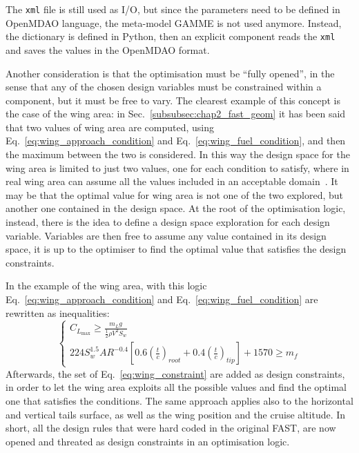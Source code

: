 The \texttt{xml} file is still used as I/O, but since the parameters need to be defined in OpenMDAO language, the meta-model GAMME is not used anymore. 
Instead, the dictionary is defined in Python, then an explicit component reads the \texttt{xml} and saves the values in the OpenMDAO format. 

Another consideration is that the optimisation must be ``fully opened'', in the sense that any of the chosen design variables must be constrained within a component, but it must be free to vary. 
The clearest example of this concept is the case of the wing area: in Sec.~\ref{subsubsec:chap2_fast_geom} it has been said that two values of wing area are computed, using Eq.~\eqref{eq:wing_approach_condition} and Eq.~\eqref{eq:wing_fuel_condition}, and then the maximum between the two is considered. 
In this way the design space for the wing area is limited to just two values, one for each condition to satisfy, where in real wing area can assume all the values included in an acceptable domain~\cite{bib:roskam_partI}. 
It may be that the optimal value for wing area is not one of the two explored, but another one contained in the design space.  
At the root of the optimisation logic, instead, there is the idea to define a design space exploration for each design variable.
Variables are then free to assume any value contained in its design space, it is up to the optimiser to find the optimal value that satisfies the design constraints. 

In the example of the wing area, with this logic Eq.~\eqref{eq:wing_approach_condition} and Eq.~\eqref{eq:wing_fuel_condition} are rewritten as inequalities:
\begin{equation}
	\label{eq:wing_constraint}
	\left\{\begin{array}{l}
			C_{L_{\max}} \geq \frac{m_{L}g}{\frac{1}{2}\rho V^2 S_{w}} \\
			224 S_{w}^{1.5}AR^{-0.4}\left[0.6\left(\frac{t}{c}\right)_{root}+0.4\left(\frac{t}{c}\right)_{tip}\right]+1570 \geq m_f
		\end{array}\right.
\end{equation}
Afterwards, the set of Eq.~\eqref{eq:wing_constraint} are added as design constraints, in order to let the wing area exploits all the possible values and find the optimal one that satisfies the conditions. 
The same approach applies also to the horizontal and vertical tails surface, as well as the wing position and the cruise altitude. 
In short, all the design rules that were hard coded in the original FAST, are now opened and threated as design constraints in an optimisation logic. 

